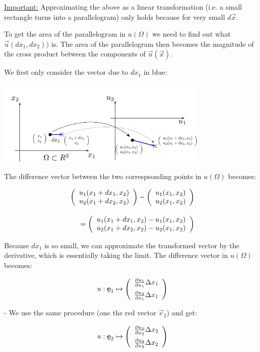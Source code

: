 \underline{Important:}
Approximating the above as a linear transformation (i.e. a small rectangle turns into a parallelogram) only holds because for very small $d\vec x$.

To get the area of the parallelogram in $u(\Omega)$ we need to find out what $\vec u(dx_1, dx_2))$ is.
The area of the parallelogram then becomes the magnitude of the cross product between the components of $\vec u(\vec x)$.

\newpage

We first only consider the vector due to $dx_1$ in blue:

\includegraphics[width=0.75\textwidth]{img/x1.pdf}

The difference vector between the two correspsonding points in $u(\Omega)$ becomes:

\begin{equation*}
\begin{array}{r}
\left( \begin{array}{rrrrrrrrrrrrrrrrrrrrrrrrrr} 
u_1 (x_1 + dx_1, x_2)\\
u_2 (x_1 + dx_2, x_2)
\\ \end{array} \right) - 
\left( \begin{array}{rrrrrrrrrrrrrrrrrrrrrrrrrr} 
u_1 (x_1, x_2)\\
u_2 (x_1, x_2)
\\ \end{array} \right) \\[0.7cm]
=
\left( \begin{array}{rrrrrrrrrrrrrrrrrrrrrrrrrr} 
u_1 (x_1 + dx_1, x_2) - u_1 (x_1, x_2)\\
u_2 (x_1 + dx_2, x_2) - u_2 (x_1, x_2)
\\ \end{array} \right)
\end{array}
\end{equation*}

Because $dx_1$ is so small, we can approximate the transformed vector by the derivative, 
which is essentially taking the limit. The difference vector in $u(\Omega)$ becomes:

$$
u: \underline{\mathbf{e}}_1 \mapsto 
\left( \begin{array}{rrrrrrrrrrrrrrrrrrrrrrrrrr} 
\frac{\partial u_1}{\partial x_1} \Delta x_1\\[0.2cm]
\frac{\partial u_2}{\partial x_1} \Delta x_1
\\ \end{array} \right)
$$


- We use the same procedure (one the red vector $\vec e_2$) and get:

$$
u: \underline{\mathbf{e}}_2 \mapsto 
\left( \begin{array}{rrrrrrrrrrrrrrrrrrrrrrrrrr} 
\frac{\partial u_1}{\partial x_2} \Delta x_2\\[0.2cm]
\frac{\partial u_2}{\partial x_2} \Delta x_2
\\ \end{array} \right)
$$

